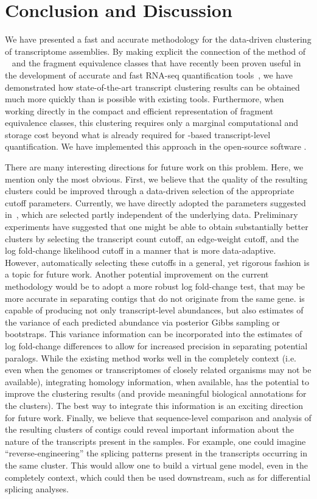 \section{Conclusion and Discussion}
\label{sec:conclusion}

We have presented a fast and accurate methodology for the data-driven clustering of \denovo transcriptome assemblies. By making explicit the connection of the method of \corset~\citep{corset} and the fragment equivalence classes that have recently been proven useful in the development of accurate and fast RNA-seq quantification tools~\cite{sailfish, salmon, kallisto}, we have demonstrated how state-of-the-art transcript clustering results can be obtained much more quickly than is possible with existing tools. Furthermore, when working directly in the compact and efficient representation of fragment equivalence classes, this clustering requires only a marginal computational and storage cost beyond what is already required for \qm-based transcript-level quantification. We have implemented this approach in the open-source software \rapclust.

There are many interesting directions for future work on this problem. Here, we mention only the most obvious. First, we believe that the quality of the resulting clusters could be improved through a data-driven selection of the appropriate cutoff parameters.  Currently, we have directly adopted the parameters suggested in~\citep{corset}, which are selected partly independent of the underlying data.  Preliminary experiments have suggested that one might be able to obtain substantially better clusters by selecting the transcript count cutoff, an edge-weight cutoff, and the log fold-change likelihood cutoff in a manner that is more data-adaptive.  However, automatically selecting these cutoffs in a general, yet rigorous fashion is a topic for future work.  Another potential improvement on the current methodology would be to adopt a more robust log fold-change test, that may be more accurate in separating contigs that do not originate from the same gene. \sailfish is capable of producing not only transcript-level abundances, but also estimates of the variance of each predicted abundance via posterior Gibbs sampling or bootstraps.  This variance information can be incorporated into the estimates of log fold-change differences to allow for increased precision in separating potential paralogs. While the existing method works well in the completely \denovo context (i.e. even when the genomes or transcriptomes of closely related organisms may not be available), integrating homology information, when available, has the potential to improve the clustering results (and provide meaningful biological annotations for the clusters). The best way to integrate this information is an exciting direction for future work. Finally, we believe that sequence-level comparison and analysis of the resulting clusters of contigs could reveal important information about the nature of the transcripts present in the samples.  For example, one could imagine ``reverse-engineering'' the splicing patterns present in the transcripts occurring in the same cluster.  This would allow one to build a virtual gene model, even in the completely \denovo context, which could then be used downstream, such as for differential splicing analyses. 